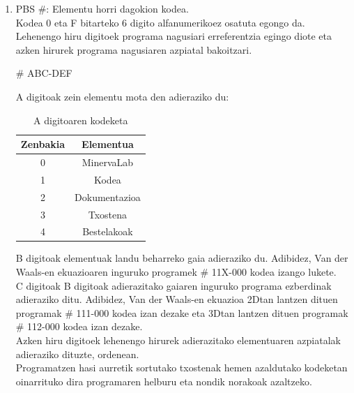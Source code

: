 \documentclass[10pt,a4paper]{article}
\let\nf\normalfont %
\newcommand{\cf}{\normalfont\sffamily}
\begin{document}
\begin{enumerate}
\item \cf PBS \#: \nf Elementu horri dagokion kodea. 
\\

Kodea 0 eta F bitarteko 6 digito alfanumerikoez osatuta egongo da. Lehenengo hiru digitoek programa nagusiari erreferentzia egingo diote eta azken hirurek programa nagusiaren azpiatal bakoitzari.
\\

\begin{center}
\cf \# ABC-DEF
\end{center}

\cf A \nf digitoak zein elementu mota den adieraziko du:


\begin{table}[h]
\begin{center}
\begin{tabular}{|c|c|}
\hline
\textbf{Zenbakia} & \textbf{Elementua} \\ \hline
0                 & MinervaLab         \\ \hline
1                 & Kodea              \\ \hline
2                 & Dokumentazioa      \\ \hline
3                 & Txostena           \\ \hline
4                 & Bestelakoak           \\ \hline
\end{tabular}
\caption{\cf A \nf digitoaren kodeketa}
\end{center}
\end{table}

\cf B \nf digitoak elementuak landu beharreko gaia adieraziko du. Adibidez, Van der Waals-en ekuazioaren inguruko programek \cf \# 11X-000 \nf kodea izango lukete.
\\

\cf C \nf digitoak \cf B \nf digitoak adierazitako gaiaren inguruko programa ezberdinak adieraziko ditu. Adibidez, Van der Waals-en ekuazioa 2Dtan lantzen dituen programak \cf \# 111-000 \nf kodea izan dezake eta 3Dtan lantzen dituen programak \cf \# 112-000 \nf kodea izan dezake.
\\

Azken hiru digitoek lehenengo hirurek adierazitako elementuaren azpiatalak adieraziko dituzte, ordenean.
\\

Programatzen hasi aurretik sortutako txostenak hemen azaldutako kodeketan oinarrituko dira programaren helburu eta nondik norakoak azaltzeko.
\\


\end{enumerate}
\end{document}

